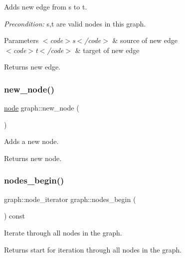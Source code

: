 Adds new edge from {\ttfamily s} to {\ttfamily t}.

{\itshape Precondition\+:} {\ttfamily s,t} are valid nodes in this graph.


\begin{DoxyParams}{Parameters}
{\em $<$code$>$s$<$/code$>$} & source of new edge \\
\hline
{\em $<$code$>$t$<$/code$>$} & target of new edge \\
\hline
\end{DoxyParams}
\begin{DoxyReturn}{Returns}
new edge. 
\end{DoxyReturn}
\mbox{\label{classgraph_ab9505335c20558319b6cce25aed23524}} 
\subsubsection{\texorpdfstring{new\+\_\+node()}{new\_node()}}
{\footnotesize\ttfamily \mbox{\hyperlink{classnode}{node}} graph\+::new\+\_\+node (\begin{DoxyParamCaption}{ }\end{DoxyParamCaption})\hspace{0.3cm}{\ttfamily [virtual]}}

Adds a new node.

\begin{DoxyReturn}{Returns}
new node. 
\end{DoxyReturn}
\mbox{\label{classgraph_aec053a4b509d1be804237a80044c54c0}} 
\subsubsection{\texorpdfstring{nodes\+\_\+begin()}{nodes\_begin()}}
{\footnotesize\ttfamily graph\+::node\+\_\+iterator graph\+::nodes\+\_\+begin (\begin{DoxyParamCaption}{ }\end{DoxyParamCaption}) const}

Iterate through all nodes in the graph.

\begin{DoxyReturn}{Returns}
start for iteration through all nodes in the graph. 
\end{DoxyReturn}
\mbox{\label{classgraph_abbf9c0cb5629e98e1142254911238173}} 
